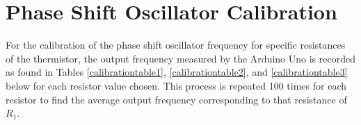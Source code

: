 \section{Phase Shift Oscillator Calibration}
\label{psocalibration}

For the calibration of the phase shift oscillator frequency for specific resistances of the thermistor, the output frequency measured by the Arduino Uno is recorded as found in Tables \ref{calibrationtable1}, \ref{calibrationtable2}, and \ref{calibrationtable3} below for each resistor value chosen. This process is repeated 100 times for each resistor to find the average output frequency corresponding to that resistance of $R_1$.  \\

	\begin{longtable}{|l|l|l|l|l|l|l|l|l|}


\end{longtable}
